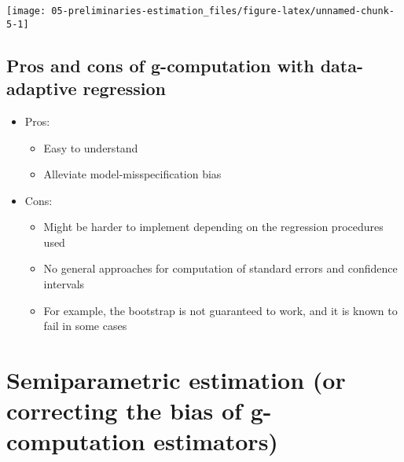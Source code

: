 \documentclass[
  12pt,
]{book}
\providecommand{\tightlist}{%
  \setlength{\itemsep}{0pt}\setlength{\parskip}{0pt}}
\theoremstyle{definition}
\theoremstyle{definition}
\theoremstyle{definition}
\newcommand{\1}{\mathbbm{1}}
\begin{document}
\begin{center}\texttt{[image: 05-preliminaries-estimation\_files/figure-latex/unnamed-chunk-5-1]} \end{center}

\hypertarget{pros-and-cons-of-g-computation-with-data-adaptive-regression}{%
\subsection{Pros and cons of g-computation with data-adaptive regression}\label{pros-and-cons-of-g-computation-with-data-adaptive-regression}}

\begin{itemize}
\tightlist
\item
  Pros:

  \begin{itemize}
  \tightlist
  \item
    Easy to understand
  \item
    Alleviate model-misspecification bias
  \end{itemize}
\item
  Cons:

  \begin{itemize}
  \tightlist
  \item
    Might be harder to implement depending on the regression procedures used
  \item
    No general approaches for computation of standard errors and confidence
    intervals
  \item
    For example, the bootstrap is not guaranteed to work, and it is known to
    fail in some cases
  \end{itemize}
\end{itemize}

\hypertarget{semiparametric-estimation-or-correcting-the-bias-of-g-computation-estimators}{%
\section{Semiparametric estimation (or correcting the bias of g-computation estimators)}\label{semiparametric-estimation-or-correcting-the-bias-of-g-computation-estimators}}
\end{document}
